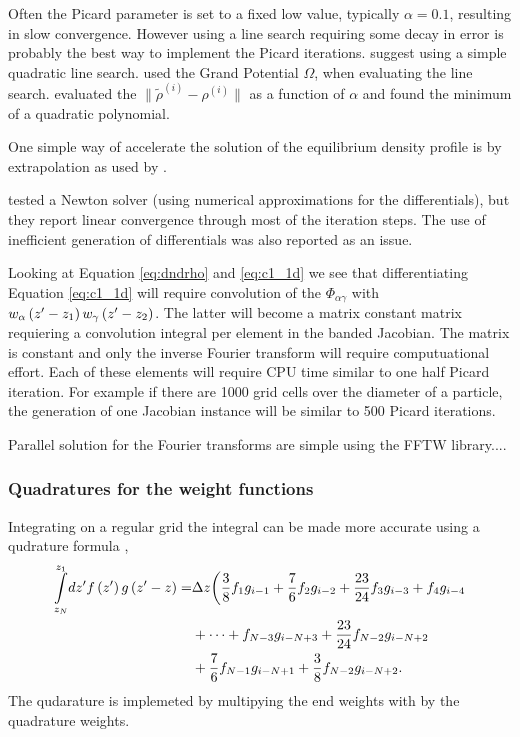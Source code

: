 \documentclass[12pt, letterpaper]{article}
\newcommand*{\lb}{\ensuremath{\left(}}
\newcommand*{\rb}{\ensuremath{\right)}}
\begin{document}
Often the Picard parameter is set to a fixed low value, typically
$\alpha=0.1$, resulting in slow convergence. However using a line
search requiring some decay in error is probably the best way to
implement the Picard iterations. \citet{roth2010} suggest using a
simple quadratic line search. \citet{roth2010} used the Grand
Potential $\Omega$, when evaluating the line
search. \cite{knepley2010} evaluated the
$\| \tilde{\rho}^{(i)} - \rho^{(i)} \|$ as a function of $\alpha$ and
found the minimum of a quadratic polynomial.

One simple way of accelerate the solution of the equilibrium density
profile is by extrapolation as used by \citet{ng1974}.

\cite{knepley2010} tested a Newton solver (using numerical
approximations for the differentials), but they report linear
convergence through most of the iteration steps. The use of
inefficient generation of differentials was also reported as an issue.

Looking at Equation \eqref{eq:dndrho} and \eqref{eq:c1_1d} we see that
differentiating Equation \eqref{eq:c1_1d} will require convolution of
the $\Phi_{\alpha\gamma}$ with
$w_\alpha \lb z^\prime - z_1\rb w_\gamma \lb z^\prime - z_2\rb$. The
latter will become a matrix constant matrix requiering a convolution
integral per element in the banded Jacobian. The matrix is constant
and only the inverse Fourier transform will require computuational
effort. Each of these elements will require CPU time similar to one
half Picard iteration. For example if there are 1000 grid cells over
the diameter of a particle, the generation of one Jacobian instance
will be similar to 500 Picard iterations.

Parallel solution for the Fourier transforms are simple using the FFTW library....

\subsubsection{Quadratures for the weight functions}
Integrating on a regular grid the integral can be made more accurate using a qudrature formula ,
\begin{align}
  \underset{z_N}{\overset{z_1}{\int}} dz^\prime f \lb z^\prime \rb g \lb z^\prime - z \rb =& \Delta z \biggl( \frac{3}{8} f_1 g_{i-1} + \frac{7}{6} f_2 g_{i-2} + \frac{23}{24} f_3 g_{i-3} + f_4 g_{i-4} \nonumber \\&+ \dots  + f_{N-3} g_{i-N+3} + \frac{23}{24} f_{N-2} g_{i-N+2} \nonumber \\&+ \frac{7}{6} f_{N-1} g_{i-N+1} + \frac{3}{8} f_{N-2} g_{i-N+2}.
\end{align}
The qudarature is implemeted by multipying the end weights with by the
quadrature weights.
\end{document}
